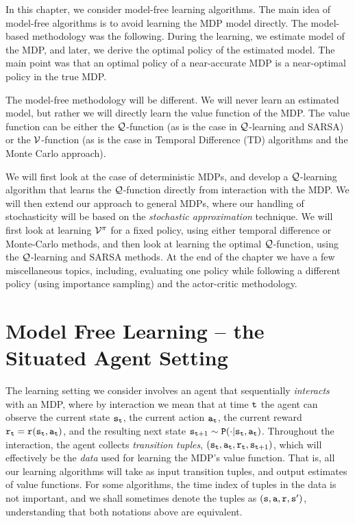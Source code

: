 In this chapter, we consider model-free learning algorithms. The main
idea of model-free algorithms is to avoid learning the MDP model
directly. The model-based methodology was the following. During the
learning, we estimate model of the MDP, and later,  we derive the
optimal policy of the estimated model. The main point was that an
optimal policy of a near-accurate MDP is a near-optimal policy in
the true MDP.

The model-free methodology will be different. We will never
learn an estimated model, but rather we will directly learn the
value function of the MDP. The value function can be either the
$\mathcal{Q}$-function (as is the case in $\mathcal{Q}$-learning and SARSA) or the
$\mathcal{V}$-function (as is the case in Temporal Difference (TD) algorithms
and the Monte Carlo approach).

We will first look at the case of deterministic MDPs, and develop a $\mathcal{Q}$-learning algorithm that learns the $\mathcal{Q}$-function directly from interaction with the MDP. We will then extend our approach to general MDPs, where our handling of stochasticity will be based on the \textit{stochastic approximation} technique. We will first look at learning $\mathcal{V}^{\pi}$ for a fixed policy, using either temporal difference or Monte-Carlo methods, and then look at learning the optimal $\mathcal{Q}$-function, using the $\mathcal{Q}$-learning and SARSA methods. At the end of the chapter we have a few miscellaneous topics, including,
evaluating one policy while following a different policy (using
importance sampling) and the actor-critic methodology.

\section{Model Free Learning -- the Situated Agent Setting}

The learning setting we consider involves an agent that sequentially \textit{interacts} with an MDP, where by interaction we mean that at time ${\tt t}$ the agent can observe the current state ${\tt s}_{{\tt t}}$, the current action ${\tt a}_{{\tt t}}$, the current reward ${\tt r}_{{\tt t}} = {\tt r}({\tt s}_{{\tt t}},{\tt a}_{{\tt t}})$, and the resulting next state ${\tt s}_{{\tt t}+1} \sim {\tt P}(\cdot | {\tt s}_{{\tt t}},{\tt a}_{{\tt t}})$. Throughout the interaction, the agent collects \textit{transition tuples}, $\left({\tt s}_{{\tt t}}, {\tt a}_{{\tt t}}, {\tt r}_{{\tt t}}, {\tt s}_{{\tt t}+1} \right)$, which will effectively be the \textit{data} used for learning the  MDP's value function. That is, all our learning algorithms will take as input transition tuples, and output estimates of value functions. For some algorithms, the time index of tuples in the data is not important, and we shall sometimes denote the tuples as $\left({\tt s}, {\tt a}, {\tt r}, {\tt s}' \right)$, understanding that both notations above are equivalent.

